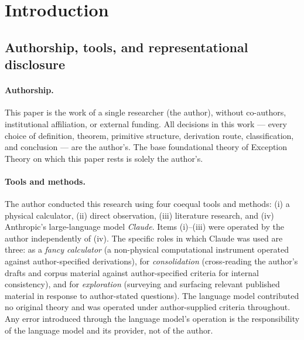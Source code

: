 \documentclass[11pt,a4paper]{article}
\theoremstyle{definition}
\theoremstyle{remark}
\begin{document}
\begin{abstract}
$\mathrm{SU}(3)\times\mathrm{SU}(2)\times\mathrm{U}(1)$ as the sole partition of $N = 12$ gauge bosons into native-sublattice simple and abelian factors (the N-Exhaustion Theorem). The construction involves zero tunable parameters, zero data-fitting, and zero external axioms. Every constant is forced.
\end{abstract}

\tableofcontents

\section{Introduction}

\subsection{Authorship, tools, and representational disclosure}\label{subsec:disclosures}

\paragraph{Authorship.} This paper is the work of a single researcher (the author), without co-authors, institutional affiliation, or external funding. All decisions in this work --- every choice of definition, theorem, primitive structure, derivation route, classification, and conclusion --- are the author's. The base foundational theory of Exception Theory on which this paper rests is solely the author's.

\paragraph{Tools and methods.} The author conducted this research using four coequal tools and methods: (i) a physical calculator, (ii) direct observation, (iii) literature research, and (iv) Anthropic's large-language model \emph{Claude}. Items (i)--(iii) were operated by the author independently of (iv). The specific roles in which Claude was used are three: as a \emph{fancy calculator} (a non-physical computational instrument operated against author-specified derivations), for \emph{consolidation} (cross-reading the author's drafts and corpus material against author-specified criteria for internal consistency), and for \emph{exploration} (surveying and surfacing relevant published material in response to author-stated questions). The language model contributed no original theory and was operated under author-supplied criteria throughout. Any error introduced through the language model's operation is the responsibility of the language model and its provider, not of the author.
\end{document}

